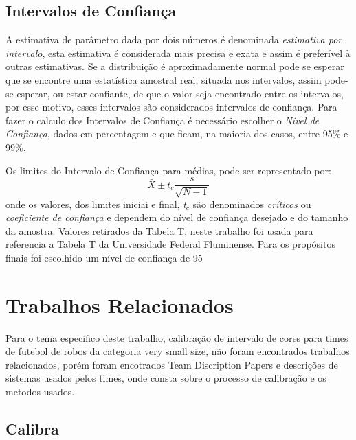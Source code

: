\subsection{Intervalos de Confiança}

A estimativa de parâmetro dada por dois números é denominada \textit{estimativa por intervalo}, esta estimativa é considerada mais precisa e exata e assim é preferível à outras estimativas. Se a distribuição é aproximadamente normal pode se esperar que se encontre uma estatística amostral real, situada nos intervalos, assim pode-se esperar, ou estar confiante, de que o valor seja encontrado entre os intervalos, por esse motivo, esses intervalos são considerados intervalos de confiança. Para fazer o calculo dos Intervalos de Confiança é necessário escolher o \textit{Nível de Confiança}, dados em percentagem e que ficam, na maioria dos casos, entre 95\% e 99\%.

Os limites do Intervalo de Confiança para médias, pode ser representado por:
\begin{displaymath}
\bar{X}  \pm \mathit{t}_{\mathit{c}}\frac{\mathit{s}}{{\sqrt{N-1}}}
\end{displaymath}
onde os valores, dos limites iniciai e final, \textit{t$_c$} são denominados \textit{críticos} ou \textit{coeficiente de confiança} e dependem do nível de confiança desejado e do tamanho da amostra. Valores retirados da Tabela T, neste trabalho foi usada para referencia a Tabela T da Universidade Federal Fluminense\cite{TabelaUFF}. Para os propósitos finais foi escolhido um nível de confiança de 95%

\section{Trabalhos Relacionados}
Para o tema especifico deste trabalho, calibração de intervalo de cores para times de futebol de robos da categoria very small size, não foram encontrados trabalhos relacionados, porém foram encotrados Team Discription Papers e descrições de sistemas usados pelos times, onde consta sobre o processo de calibração e os metodos usados.

\subsection{Calibra}
